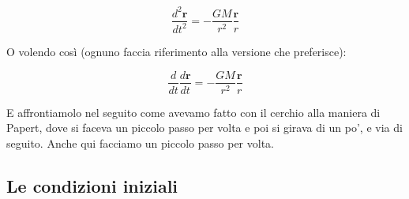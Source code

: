 \begin{equation}
\frac{d^2\mathbf{r}}{dt^2}=-\frac{GM}{r^2}\frac{\mathbf{r}}{r}
\end{equation}

O volendo così (ognuno faccia riferimento alla versione che preferisce):

\begin{equation}
\frac{d}{dt}\frac{d\mathbf{r}}{dt}=-\frac{GM}{r^2}\frac{\mathbf{r}}{r}
\end{equation}

E affrontiamolo nel seguito come avevamo fatto con il cerchio alla maniera di Papert, dove si faceva un piccolo passo per volta e poi si girava di un po', e via di seguito. Anche qui facciamo un piccolo passo per volta. 

\subsection{Le condizioni iniziali}

